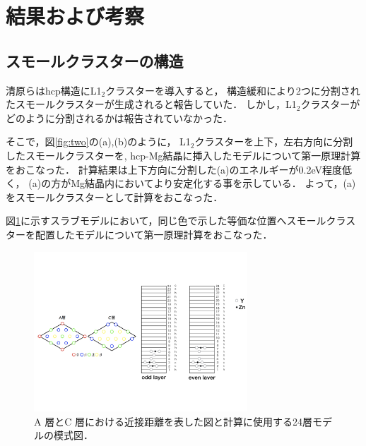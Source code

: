 \documentclass[a4j,twocolumn]{jsarticle}
\begin{document}
\section{結果および考察}
\subsection{スモールクラスターの構造}
清原らはhcp構造にL1$_2$クラスターを導入すると，
構造緩和により2つに分割されたスモールクラスターが生成されると報告していた\cite{kiyohara}．
しかし，L1$_2$クラスターがどのように分割されるかは報告されていなかった．

そこで，図\ref{fig:two}の(a),(b)のように，
L1$_2$クラスターを上下，左右方向に分割したスモールクラスターを,
hcp-Mg結晶に挿入したモデルについて第一原理計算をおこなった．
計算結果は上下方向に分割した(a)のエネルギーが0.2eV程度低く，
(a)の方がMg結晶内においてより安定化する事を示している．
よって，(a)をスモールクラスターとして計算をおこなった．

図\ref{fig:one}に示すスラブモデルにおいて，同じ色で示した等価な位置へスモールクラスターを配置したモデルについて第一原理計算をおこなった．

\begin{figure}[H]
\vspace{-1.3\baselineskip}
\begin{center}
   \includegraphics[width=80mm]{./slab24_color.jpeg}
   \vspace{-0.6\baselineskip}
  \caption{A 層とC 層における近接距離を表した図と計算に使用する24層モデルの模式図．}
  \label{fig:one}
\end{center}
\end{figure}
\end{document}
